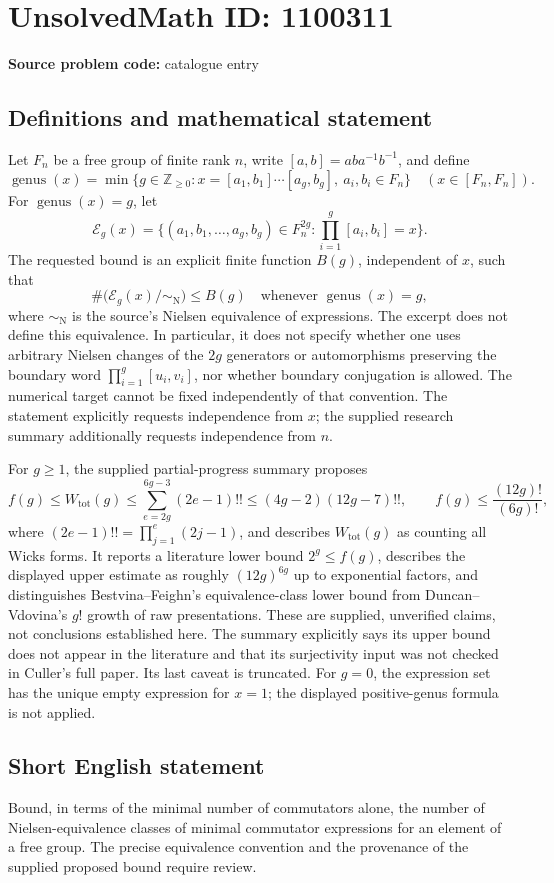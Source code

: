 \documentclass[11pt]{article}
\newcommand{\Z}{\mathbb{Z}}
\begin{document}
\section*{UnsolvedMath ID: 1100311}
\textbf{Source problem code:} catalogue entry
\subsection{Definitions and mathematical statement}
Let \(F_n\) be a free group of finite rank \(n\), write \([a,b]=aba^{-1}b^{-1}\), and define
\[
\operatorname{genus}(x)=\min\{g\in\Z_{\ge0}:x=[a_1,b_1]\cdots[a_g,b_g],\ a_i,b_i\in F_n\}
\quad(x\in[F_n,F_n]).
\]
For \(\operatorname{genus}(x)=g\), let
\[
\mathcal E_g(x)=\{(a_1,b_1,\ldots,a_g,b_g)\in F_n^{2g}:\prod_{i=1}^g[a_i,b_i]=x\}.
\]
The requested bound is an explicit finite function \(B(g)\), independent of \(x\), such that
\[
\#\bigl(\mathcal E_g(x)/{\sim_{\mathrm N}}\bigr)\le B(g)
\quad\text{whenever }\operatorname{genus}(x)=g,
\]
where \(\sim_{\mathrm N}\) is the source's Nielsen equivalence of expressions. The excerpt does not define this equivalence. In particular, it does not specify whether one uses arbitrary Nielsen changes of the \(2g\) generators or automorphisms preserving the boundary word \(\prod_{i=1}^g[u_i,v_i]\), nor whether boundary conjugation is allowed. The numerical target cannot be fixed independently of that convention. The statement explicitly requests independence from \(x\); the supplied research summary additionally requests independence from \(n\).

For \(g\ge1\), the supplied partial-progress summary proposes
\[
 f(g)\le W_{\mathrm{tot}}(g)\le\sum_{e=2g}^{6g-3}(2e-1)!!
 \le(4g-2)(12g-7)!!,
\qquad f(g)\le\frac{(12g)!}{(6g)!},
\]
where \((2e-1)!!=\prod_{j=1}^{e}(2j-1)\), and describes \(W_{\mathrm{tot}}(g)\) as counting all Wicks forms. It reports a literature lower bound \(2^g\le f(g)\), describes the displayed upper estimate as roughly \((12g)^{6g}\) up to exponential factors, and distinguishes Bestvina--Feighn's equivalence-class lower bound from Duncan--Vdovina's \(g!\) growth of raw presentations. These are supplied, unverified claims, not conclusions established here. The summary explicitly says its upper bound does not appear in the literature and that its surjectivity input was not checked in Culler's full paper. Its last caveat is truncated. For \(g=0\), the expression set has the unique empty expression for \(x=1\); the displayed positive-genus formula is not applied.
\subsection{Short English statement}
Bound, in terms of the minimal number of commutators alone, the number of Nielsen-equivalence classes of minimal commutator expressions for an element of a free group. The precise equivalence convention and the provenance of the supplied proposed bound require review.
\end{document}
